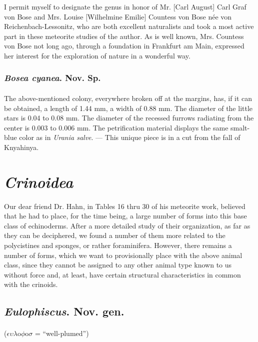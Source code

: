 \documentclass[a4paper, 12pt, oneside]{article}
\begin{document}
I permit myself to designate the genus in honor of Mr. [Carl August] Carl Graf von Bose and Mrs. Louise [Wilhelmine Emilie] Countess von Bose née von Reichenbach-Lessonitz, who are both excellent naturalists and took a most active part in these meteorite studies of the author. As is well known, Mrs. Countess von Bose not long ago, through a foundation in Frankfurt am Main, expressed her interest for the exploration of nature in a wonderful way.
\subsubsection{\emph{Bosea cyanea}. Nov. Sp.}
\paragraph{}
The above-mentioned colony, everywhere broken off at the margins, has, if it can be obtained, a length of 1.44 mm, a width of 0.88 mm. The diameter of the little stars is 0.04 to 0.08 mm. The diameter of the recessed furrows radiating from the center is 0.003 to 0.006 mm. The petrification material displays the same smalt-blue color as in \emph{Urania salve}. --- This unique piece is in a cut from the fall of Knyahinya.
\clearpage
\section{\emph{Crinoidea}}
\paragraph{}
Our dear friend Dr. Hahn, in Tables 16 thru 30 of his meteorite work, believed that he had to place, for the time being, a large number of forms into this base class of echinoderms. After a more detailed study of their organization, as far as they can be deciphered, we found a number of them more related to the polycistines and sponges, or rather foraminifera. However, there remains a number of forms, which we want to provisionally place with the above animal class, since they cannot be assigned to any other animal type known to us without force and, at least, have certain structural characteristics in common with the crinoids.
\subsection{\emph{Eulophiscus}. Nov. gen.}
\paragraph{}
($\epsilon\upsilon\lambda$o$\phi$o$\sigma$ = ``well-plumed'')%
\end{document}

